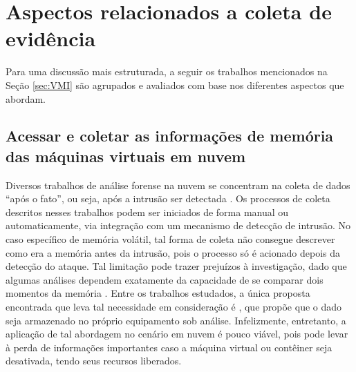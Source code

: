 \section{Aspectos relacionados a coleta de evidência}
\label{sec:coletadeevidencia}

Para uma discussão mais estruturada, a seguir os trabalhos mencionados na Seção \ref{sec:VMI} são agrupados e avaliados com base nos diferentes aspectos que abordam.

\subsection{Acessar e coletar as informações de memória das máquinas virtuais em nuvem}
\label{sec:coletadeevidencia}

Diversos trabalhos de análise forense na nuvem se concentram na coleta de dados ``após o fato'', ou seja, após a intrusão ser detectada \cite{ReichertAutoAcquisition:2015,PoiselVMI:2013,DykstraFROST:2013,GeorgeDF2CE:2012,SangLogApproach:2013}. 
%
Os processos de coleta descritos nesses trabalhos podem ser iniciados de forma manual ou automaticamente, via integração com um mecanismo de detecção de intrusão. 
%
No caso específico de memória volátil, tal forma de coleta não consegue descrever como era a memória antes da intrusão, pois o processo só é acionado depois da detecção do ataque. 
%
Tal limitação pode trazer prejuízos à investigação, dado que algumas análises dependem exatamente da capacidade de se comparar dois momentos da memória \cite{CaseMemoryForensics:2014}. 
%
Entre os trabalhos estudados, a única proposta encontrada que leva tal necessidade em consideração é \cite{DezfouliBackupApproach:2012}, que propõe que o dado seja armazenado no próprio equipamento sob análise.
%
Infelizmente, entretanto, a aplicação de tal abordagem no cenário em nuvem é pouco viável, pois pode levar à perda de informações importantes caso a máquina virtual ou contêiner seja desativada, tendo seus recursos liberados.
%

